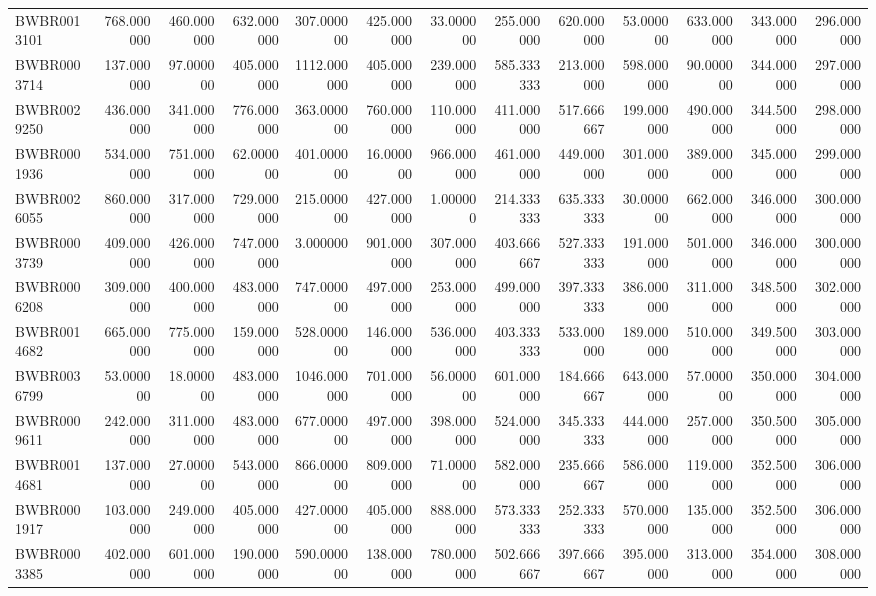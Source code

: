 \begin{longtable}{lrrrrrrrrrrrr}
BWBR0013101 & 768.000000 & 460.000000 & 632.000000 & 307.000000 & 425.000000 & 33.000000 & 255.000000 & 620.000000 & 53.000000 & 633.000000 & 343.000000 & 296.000000 \\
BWBR0003714 & 137.000000 & 97.000000 & 405.000000 & 1112.000000 & 405.000000 & 239.000000 & 585.333333 & 213.000000 & 598.000000 & 90.000000 & 344.000000 & 297.000000 \\
BWBR0029250 & 436.000000 & 341.000000 & 776.000000 & 363.000000 & 760.000000 & 110.000000 & 411.000000 & 517.666667 & 199.000000 & 490.000000 & 344.500000 & 298.000000 \\
BWBR0001936 & 534.000000 & 751.000000 & 62.000000 & 401.000000 & 16.000000 & 966.000000 & 461.000000 & 449.000000 & 301.000000 & 389.000000 & 345.000000 & 299.000000 \\
BWBR0026055 & 860.000000 & 317.000000 & 729.000000 & 215.000000 & 427.000000 & 1.000000 & 214.333333 & 635.333333 & 30.000000 & 662.000000 & 346.000000 & 300.000000 \\
BWBR0003739 & 409.000000 & 426.000000 & 747.000000 & 3.000000 & 901.000000 & 307.000000 & 403.666667 & 527.333333 & 191.000000 & 501.000000 & 346.000000 & 300.000000 \\
BWBR0006208 & 309.000000 & 400.000000 & 483.000000 & 747.000000 & 497.000000 & 253.000000 & 499.000000 & 397.333333 & 386.000000 & 311.000000 & 348.500000 & 302.000000 \\
BWBR0014682 & 665.000000 & 775.000000 & 159.000000 & 528.000000 & 146.000000 & 536.000000 & 403.333333 & 533.000000 & 189.000000 & 510.000000 & 349.500000 & 303.000000 \\
BWBR0036799 & 53.000000 & 18.000000 & 483.000000 & 1046.000000 & 701.000000 & 56.000000 & 601.000000 & 184.666667 & 643.000000 & 57.000000 & 350.000000 & 304.000000 \\
BWBR0009611 & 242.000000 & 311.000000 & 483.000000 & 677.000000 & 497.000000 & 398.000000 & 524.000000 & 345.333333 & 444.000000 & 257.000000 & 350.500000 & 305.000000 \\
BWBR0014681 & 137.000000 & 27.000000 & 543.000000 & 866.000000 & 809.000000 & 71.000000 & 582.000000 & 235.666667 & 586.000000 & 119.000000 & 352.500000 & 306.000000 \\
BWBR0001917 & 103.000000 & 249.000000 & 405.000000 & 427.000000 & 405.000000 & 888.000000 & 573.333333 & 252.333333 & 570.000000 & 135.000000 & 352.500000 & 306.000000 \\
BWBR0003385 & 402.000000 & 601.000000 & 190.000000 & 590.000000 & 138.000000 & 780.000000 & 502.666667 & 397.666667 & 395.000000 & 313.000000 & 354.000000 & 308.000000 \\

\end{longtable}
